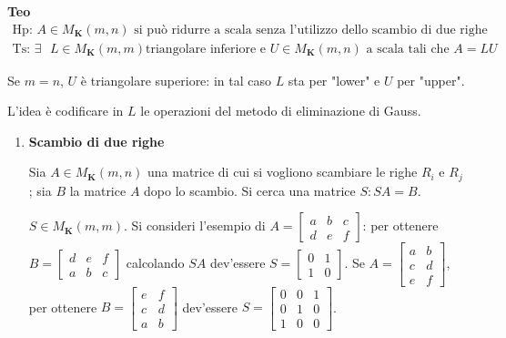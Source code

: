 \documentclass{article}
\begin{document}
\textbf{Teo}%
\begin{gather*}
\text{Hp}\text{: }A\in M_{\mathbf{K}}\left( m,n\right) \text{ si pu\`{o}
ridurre a scala senza l'utilizzo dello scambio di due righe} \\
\text{Ts}\text{: }\exists \text{ }L\in M_{\mathbf{K}}\left( m,m\right) \text{
triangolare inferiore e }U\in M_{\mathbf{K}}\left( m,n\right) \text{ a scala
tali che }A=LU
\end{gather*}

Se $m=n$, $U$ \`{e} triangolare superiore: in tal caso $L$ sta per "lower" e 
$U$ per "upper".

L'idea \`{e} codificare in $L$ le operazioni del metodo di eliminazione di
Gauss.

\begin{enumerate}
\item \textbf{Scambio di due righe}

Sia $A\in M_{\mathbf{K}}\left( m,n\right) $ una matrice di cui si vogliono
scambiare le righe $R_{i}$ e $R_{j}$; sia $B$ la matrice $A$ dopo lo
scambio. Si cerca una matrice $S:SA=B$.

$S\in M_{\mathbf{K}}\left( m,m\right) $. Si consideri l'esempio di $A=\left[ 
\begin{array}{ccc}
a & b & c \\ 
d & e & f%
\end{array}%
\right] $: per ottenere $B=\left[ 
\begin{array}{ccc}
d & e & f \\ 
a & b & c%
\end{array}%
\right] $ calcolando $SA$ dev'essere $S=\left[ 
\begin{array}{cc}
0 & 1 \\ 
1 & 0%
\end{array}%
\right] $. Se $A=\left[ 
\begin{array}{cc}
a & b \\ 
c & d \\ 
e & f%
\end{array}%
\right] $, per ottenere $B=\left[ 
\begin{array}{cc}
e & f \\ 
c & d \\ 
a & b%
\end{array}%
\right] $ dev'essere $S=\left[ 
\begin{array}{ccc}
0 & 0 & 1 \\ 
0 & 1 & 0 \\ 
1 & 0 & 0%
\end{array}%
\right] $.


\end{enumerate}
\end{document}
